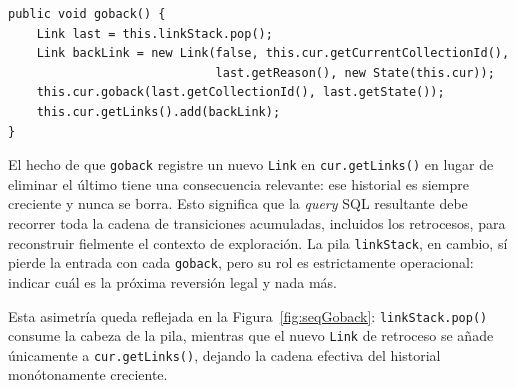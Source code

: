 \begin{lstlisting}[style=javaStyle, caption=Operación \texttt{goback}, label=lst:goback]
public void goback() {
    Link last = this.linkStack.pop();
    Link backLink = new Link(false, this.cur.getCurrentCollectionId(),
                             last.getReason(), new State(this.cur));
    this.cur.goback(last.getCollectionId(), last.getState());
    this.cur.getLinks().add(backLink);
}
\end{lstlisting}

El hecho de que \texttt{goback} registre un nuevo \texttt{Link} en
\texttt{cur.getLinks()} en lugar de eliminar el último tiene una consecuencia relevante:
ese historial es siempre creciente y nunca se borra. Esto significa que la \textit{query} SQL
resultante debe recorrer toda la cadena de transiciones acumuladas, incluidos los
retrocesos, para reconstruir fielmente el contexto de exploración. La pila
\texttt{linkStack}, en cambio, sí pierde la entrada con cada \texttt{goback}, pero su rol
es estrictamente operacional: indicar cuál es la próxima reversión legal y nada más.

Esta asimetría queda reflejada en la
Figura~\ref{fig:seqGoback}: \texttt{linkStack.pop()} consume la cabeza
de la pila, mientras que el nuevo \texttt{Link} de retroceso se añade
únicamente a \texttt{cur.getLinks()}, dejando la cadena efectiva del
historial monótonamente creciente.

